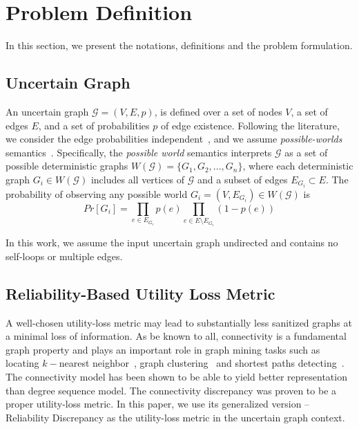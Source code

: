 \section{Problem Definition}
\label{sec:notation}

In this section, we present the notations, definitions and the problem formulation.  

\subsection{Uncertain Graph}
An uncertain graph $\mathcal{G}=(V,E,\mathit{p})$, is defined over a set of nodes $V$, a set of edges $E$, and a set of probabilities $\mathit{p}$ of edge existence. Following the literature, we consider the edge probabilities independent~\cite{Potamias_K_2010,Zhao_Detecting_2014,Hua_Probabilistic_2010,Jin_Distance_2011}, and we assume \emph{possible-worlds} semantics~\cite{Colbourn_Colbourn_1987}. Specifically, the \emph{possible world} semantics interprets $\mathcal{G}$ as a set of possible deterministic graphs 
$W(\mathcal{G}) = \{G_1, G_2, ..., G_n\}$, where each deterministic graph $G_i \in W(\mathcal{G})$ includes all vertices of $\mathcal{G}$ 
and a subset of edges $E_{G_i} \subset E$.  
The probability of observing any possible world $G_i=(V,E_{G_i}) \in W(\mathcal{G})$ is    
\begin{equation*}
    Pr[G_i]=\prod_{e \in E_{G_i}} {\mathit{p}(e)} \prod_{e \in E \setminus E_{G_i}} (1-\mathit{p}(e))
\end{equation*}

In this work, we assume the input uncertain graph undirected and contains no self-loops or multiple edges. 


\subsection{Reliability-Based Utility Loss Metric}
A well-chosen utility-loss metric may lead to substantially less sanitized graphs at a minimal loss of information. 
As be known to all, connectivity is a fundamental graph property and plays an important role in graph mining tasks such as locating $k-$nearest neighbor~\cite{Potamias_K_2010}, graph clustering~\cite{Asthana_Predicting_2004} and shortest paths detecting~\cite{Zhao_Detecting_2014}. The connectivity model has been shown to be able to yield better representation than degree sequence model. The connectivity discrepancy was proven to be a proper utility-loss metric. In this paper, we use its generalized version -- Reliability Discrepancy as the utility-loss metric in the uncertain graph context. 
 
